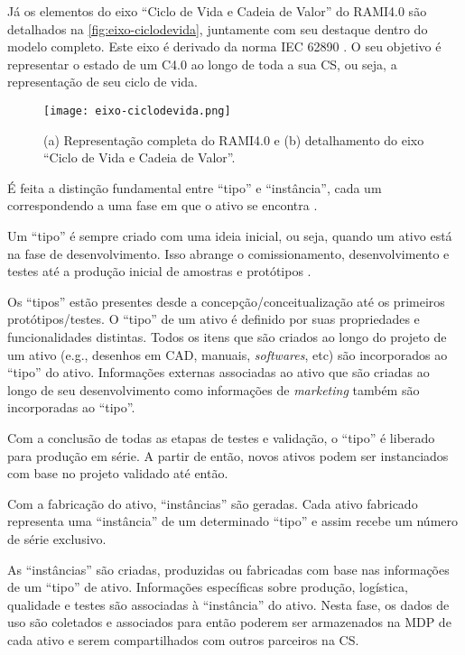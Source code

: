 Já os elementos do eixo ``Ciclo de Vida e Cadeia de Valor'' do RAMI4.0 são detalhados na \autoref{fig:eixo-ciclodevida}, juntamente com seu destaque dentro do modelo completo. Este eixo é derivado da norma IEC 62890 \cite{adolphs2015rami}. O seu objetivo é representar o estado de um C4.0 ao longo de toda a sua CS, ou seja, a representação de seu ciclo de vida.

\begin{figure}[htb]
	\centering
	\texttt{[image: eixo-ciclodevida.png]}
	\caption{(a) Representação completa do RAMI4.0 e (b) detalhamento do eixo ``Ciclo de Vida e Cadeia de Valor''.}
	\label{fig:eixo-ciclodevida}
\end{figure}

É feita a distinção fundamental entre ``tipo'' e ``instância'', cada um correspondendo a uma fase em que o ativo se encontra \cite{adolphs2015rami}.

Um ``tipo'' é sempre criado com uma ideia inicial, ou seja, quando um ativo está na fase de desenvolvimento. Isso abrange o comissionamento, desenvolvimento e testes até a produção inicial de amostras e protótipos \cite{adolph2018roadmap}.

Os ``tipos'' estão presentes desde a concepção/conceitualização até os primeiros protótipos/testes. O ``tipo'' de um ativo é definido por suas propriedades e funcionalidades distintas. Todos os itens que são criados ao longo do projeto de um ativo (e.g., desenhos em CAD, manuais, \textit{softwares}, etc) são incorporados ao ``tipo'' do ativo. Informações externas associadas ao ativo que são criadas ao longo de seu desenvolvimento como informações de \textit{marketing} também são incorporadas ao ``tipo''.

Com a conclusão de todas as etapas de testes e validação, o ``tipo'' é liberado para produção em série. A partir de então, novos ativos podem ser instanciados com base no projeto validado até então.

Com a fabricação do ativo, ``instâncias'' são geradas. Cada ativo fabricado representa uma ``instância'' de um determinado ``tipo'' e assim recebe um número de série exclusivo.

As ``instâncias'' são criadas, produzidas ou fabricadas com base nas informações de um ``tipo'' de ativo. Informações específicas sobre produção, logística, qualidade e testes são associadas à ``instância'' do ativo. Nesta fase, os dados de uso são coletados e associados para então poderem ser armazenados na MDP de cada ativo e serem compartilhados com outros parceiros na CS.

